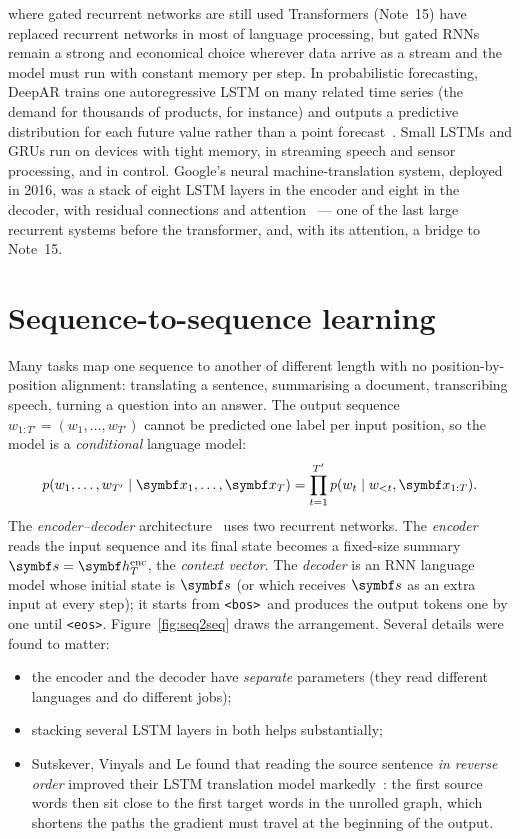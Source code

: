 \documentclass[11pt]{article}
\newcommand{\hv}{\vect{h}}
\newcommand{\bos}{\texttt{<bos>}}
\newcommand{\eos}{\texttt{<eos>}}
\begin{document}
\begin{modern}{where gated recurrent networks are still used}
Transformers (Note~15) have replaced recurrent networks in most of language processing, but gated RNNs remain a strong
and economical choice wherever data arrive as a stream and the model must run with constant memory per step. In
probabilistic forecasting, DeepAR trains one autoregressive LSTM on many related time series (the demand for thousands of
products, for instance) and outputs a predictive distribution for each future value rather than a point
forecast~\cite{salinas2020}. Small LSTMs and GRUs run on devices with tight memory, in streaming speech and sensor
processing, and in control. Google's neural machine-translation system, deployed in 2016, was a stack of eight LSTM layers in the
encoder and eight in the decoder, with residual connections and attention~\cite{wu2016} --- one of the last large
recurrent systems before the transformer, and, with its attention, a bridge to Note~15.
\end{modern}

\section{Sequence-to-sequence learning}\label{sec:seq2seq}

Many tasks map one sequence to another of different length with no position-by-position alignment: translating a
sentence, summarising a document, transcribing speech, turning a question into an answer. The output sequence
$w_{1:T'} = (w_1, \dots, w_{T'})$ cannot be predicted one label per input position, so the model is a \emph{conditional} language
model:
\begin{equation}\label{eq:condlm}
  p(w_1, \dots, w_{T'} \mid \x_1, \dots, \x_{T}) = \prod_{t=1}^{T'} p(w_t \mid w_{<t}, \x_{1:T}) .
\end{equation}
The \emph{encoder--decoder} architecture~\cite{cho2014,sutskever2014} uses two recurrent networks. The \emph{encoder}
reads the input sequence and its final state becomes a fixed-size summary $\vect{s} = \hv^{\mathrm{enc}}_T$, the
\emph{context vector}. The \emph{decoder} is an RNN language model whose initial state is $\vect{s}$ (or which receives
$\vect{s}$ as an extra input at every step); it starts from \bos\ and produces the output tokens one by one until \eos.
Figure~\ref{fig:seq2seq} draws the arrangement. Several details were found to matter:
\begin{itemize}
\item the encoder and the decoder have \emph{separate} parameters (they read different languages and do different jobs);
\item stacking several LSTM layers in both helps substantially;
\item Sutskever, Vinyals and Le found that reading the source sentence \emph{in reverse order} improved their LSTM
  translation model markedly~\cite{sutskever2014}: the first source words then sit close to the first target words in the
  unrolled graph, which shortens the paths the gradient must travel at the beginning of the output.
\end{itemize}
\end{document}
